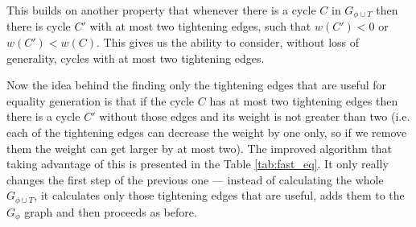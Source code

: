 This builds on another property that whenever there is a cycle $C$ in $G_{\phi \cup
T}$ then there is cycle $C'$ with at most two tightening edges, such that $w(C')
< 0$ or $w(C') < w(C)$. This gives us the ability to consider, without loss of
generality, cycles with at most two tightening edges.

Now the idea behind the finding only the tightening edges that are useful for
equality generation is that if the cycle $C$ has at most two tightening edges
then there is a cycle $C'$ without those edges and its weight is not greater
than two (i.e. each of the tightening edges can decrease the weight by one only,
so if we remove them the weight can get larger by at most two).
The improved algorithm that taking advantage of this is presented in the Table
\ref{tab:fast_eq}. It only really changes the first step of the previous one ---
instead of calculating the whole $G_{\phi \cup T}$, it calculates only those
tightening edges that are useful, adds them to the $G_\phi$ graph and then
proceeds as before.
